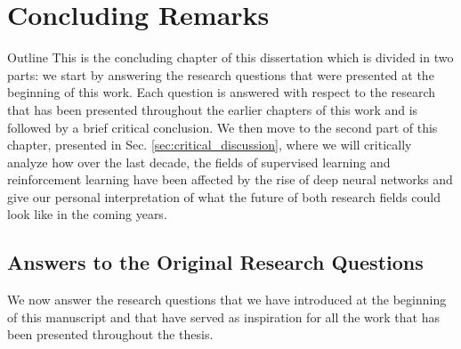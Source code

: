 
\chapter{Concluding Remarks} %
\label{ch:upside_down_rl} %

\begin{remark}{Outline}
This is the concluding chapter of this dissertation which is divided in two parts: we start by answering the research questions that were presented at the beginning of this work. Each question is answered with respect to the research that has been presented throughout the earlier chapters of this work and is followed by a brief critical conclusion. We then move to the second part of this chapter, presented in Sec. \ref{sec:critical_discussion}, where we will critically analyze how over the last decade, the fields of supervised learning and reinforcement learning have been affected by the rise of deep neural networks and give our personal interpretation of what the future of both research fields could look like in the coming years. 
\end{remark}


\section{Answers to the Original Research Questions}
\label{sec:answers}

We now answer the research questions that we have introduced at the beginning of this manuscript and that have served as inspiration for all the work that has been presented throughout the thesis.


